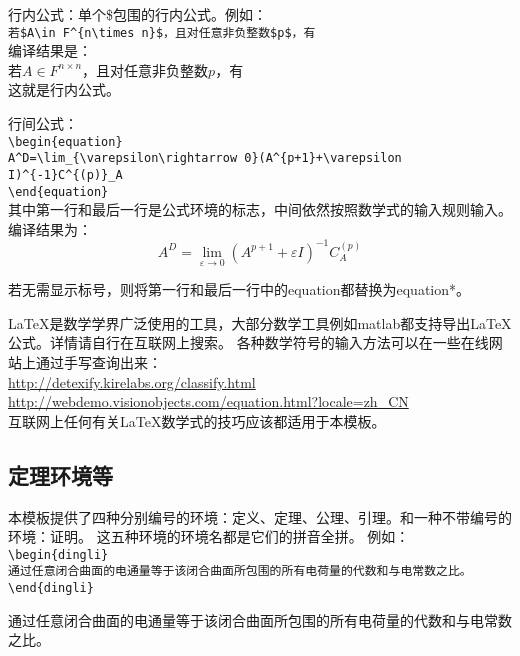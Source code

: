 行内公式：单个\$包围的行内公式。例如：\\
\verb|若$A\in F^{n\times n}$，且对任意非负整数$p$，有|\\
编译结果是：\\
若$A\in F^{n\times n}$，且对任意非负整数$p$，有\\
这就是行内公式。

行间公式：\\
\verb|\begin{equation}|\\
\verb|A^D=\lim_{\varepsilon\rightarrow 0}(A^{p+1}+\varepsilon I)^{-1}C^{(p)}_A|\\
\verb|\end{equation}|\\
其中第一行和最后一行是公式环境的标志，中间依然按照数学式的输入规则输入。\\
编译结果为：\\
\begin{equation}
A^D=\lim_{\varepsilon\rightarrow 0}(A^{p+1}+\varepsilon I)^{-1}C^{(p)}_A
\end{equation}

若无需显示标号，则将第一行和最后一行中的equation都替换为equation*。

\LaTeX 是数学学界广泛使用的工具，大部分数学工具例如matlab都支持导出LaTeX公式。详情请自行在互联网上搜索。
各种数学符号的输入方法可以在一些在线网站上通过手写查询出来：\\\url{http://detexify.kirelabs.org/classify.html}\\
\url{http://webdemo.visionobjects.com/equation.html?locale=zh_CN}\\
互联网上任何有关LaTeX数学式的技巧应该都适用于本模板。

\subsection{定理环境等}
本模板提供了四种分别编号的环境：定义、定理、公理、引理。和一种不带编号的环境：证明。
这五种环境的环境名都是它们的拼音全拼。
例如：\\
\verb|\begin{dingli}|\\
\verb|通过任意闭合曲面的电通量等于该闭合曲面所包围的所有电荷量的代数和与电常数之比。|\\
\verb|\end{dingli}|\\
\begin{dingli}
通过任意闭合曲面的电通量等于该闭合曲面所包围的所有电荷量的代数和与电常数之比。
\end{dingli}


